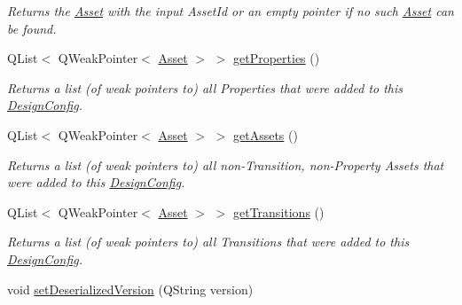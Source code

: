 \begin{DoxyCompactItemize}
\begin{DoxyCompactList}\small\item\em Returns the \hyperlink{class_picto_1_1_asset}{Asset} with the input Asset\-Id or an empty pointer if no such \hyperlink{class_picto_1_1_asset}{Asset} can be found. \end{DoxyCompactList}\item 
\hypertarget{class_picto_1_1_design_config_a023e4e41d8bd724ffd3885c4487d1ed7}{Q\-List$<$ Q\-Weak\-Pointer$<$ \hyperlink{class_picto_1_1_asset}{Asset} $>$ $>$ \hyperlink{class_picto_1_1_design_config_a023e4e41d8bd724ffd3885c4487d1ed7}{get\-Properties} ()}\label{class_picto_1_1_design_config_a023e4e41d8bd724ffd3885c4487d1ed7}

\begin{DoxyCompactList}\small\item\em Returns a list (of weak pointers to) all Properties that were added to this \hyperlink{class_picto_1_1_design_config}{Design\-Config}. \end{DoxyCompactList}\item 
\hypertarget{class_picto_1_1_design_config_af5588269acd266b8680e18f5235e63ac}{Q\-List$<$ Q\-Weak\-Pointer$<$ \hyperlink{class_picto_1_1_asset}{Asset} $>$ $>$ \hyperlink{class_picto_1_1_design_config_af5588269acd266b8680e18f5235e63ac}{get\-Assets} ()}\label{class_picto_1_1_design_config_af5588269acd266b8680e18f5235e63ac}

\begin{DoxyCompactList}\small\item\em Returns a list (of weak pointers to) all non-\/\-Transition, non-\/\-Property Assets that were added to this \hyperlink{class_picto_1_1_design_config}{Design\-Config}. \end{DoxyCompactList}\item 
\hypertarget{class_picto_1_1_design_config_aea7afa8c25beb97852ed518f4a13e252}{Q\-List$<$ Q\-Weak\-Pointer$<$ \hyperlink{class_picto_1_1_asset}{Asset} $>$ $>$ \hyperlink{class_picto_1_1_design_config_aea7afa8c25beb97852ed518f4a13e252}{get\-Transitions} ()}\label{class_picto_1_1_design_config_aea7afa8c25beb97852ed518f4a13e252}

\begin{DoxyCompactList}\small\item\em Returns a list (of weak pointers to) all Transitions that were added to this \hyperlink{class_picto_1_1_design_config}{Design\-Config}. \end{DoxyCompactList}\item 
\hypertarget{class_picto_1_1_design_config_ad77decc05c2033ef2f0eb049f3d415ba}{void \hyperlink{class_picto_1_1_design_config_ad77decc05c2033ef2f0eb049f3d415ba}{set\-Deserialized\-Version} (Q\-String version)}\label{class_picto_1_1_design_config_ad77decc05c2033ef2f0eb049f3d415ba}


\end{DoxyCompactItemize}
